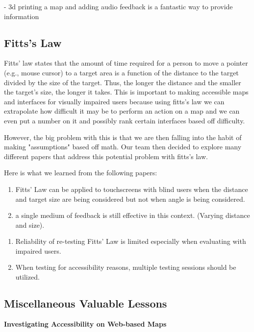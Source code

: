 \documentclass{article}
\begin{document}
\cite{10.1145/3186894}
-   3d printing a map and adding audio feedback is a fantastic way to provide information



\subsection{Fitts's Law}
Fitts' law states that the amount of time required for a person to move a pointer (e.g., mouse cursor) to a target area is a function of the distance to the target divided by the size of the target. Thus, the longer the distance and the smaller the target's size, the longer it takes. This is important to making accessible maps and interfaces for visually impaired users because using fitts's law we can extrapolate how difficult it may be to perform an action on a map and we can even put a number on it and possibly rank certain interfaces based off difficulty.
\newline
\par However, the big problem with this is that we are then falling into the habit of making "assumptions" based off math. Our team then decided to explore many different papers that address this potential problem with fitts's law.
\newline
\par Here is what we learned from the following papers:

\cite{LAHIB201816}
\begin{enumerate}
    \item Fitts' Law can be applied to touchscreens with blind users when the distance and target size are being considered but not when angle is being considered. 
    \item a single medium of feedback is still effective in this context. (Varying distance and size).
\end{enumerate}

\cite{10.1145/3373625.3416999}
\begin{enumerate}
    \item Reliability of re-testing Fitts' Law is limited especially when evaluating with impaired users. 
    \item When testing for accessibility reasons, multiple testing sessions should be utilized. 
\end{enumerate}

\subsection{Miscellaneous Valuable Lessons}
\cite{10.1145/2815169.2815171} \textbf{Investigating Accessibility on Web-based Maps } 
\end{document}
